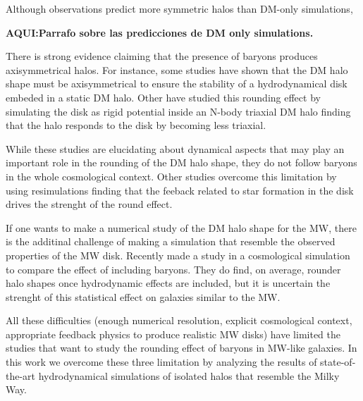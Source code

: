 \documentclass[a4paper,fleqn,usenatbib]{mnras}
\begin{document}
Although observations predict more symmetric halos than DM-only
simulations, 

{\bf AQUI:Parrafo sobre las predicciones de DM only simulations.} 

There is strong evidence claiming that the presence of
baryons produces axisymmetrical halos. 
For instance, some studies have shown that the DM halo shape must be
axisymmetrical to ensure the stability of a hydrodynamical disk
embeded in a static DM halo. 
Other have studied this rounding effect by simulating the disk as rigid
potential inside an N-body triaxial DM
halo \cite{Debattista_et_al._2008,Debattista_et_al._2013,Kazantzidis_et_al._2010}
finding that the halo responds to the disk by becoming less triaxial. 

While these studies are elucidating about dynamical aspects that may
play an important role in the rounding of the DM halo shape, they do not
follow baryons in the whole cosmological context. 
Other studies overcome this limitation by using resimulations 
\citep{Abadi_et_al._2010,Bryan_et_al._2013} finding that the
feeback related to star formation in the disk drives the strenght of
the round effect. 


If one wants to make a numerical study of the DM halo shape for the
MW, there is the additinal challenge of making a simulation that
resemble the observed properties of the MW disk.
Recently \cite{2018arXiv180907255C} made a study in a cosmological
simulation to compare the effect of including baryons. They do find,
on average, rounder halo shapes once hydrodynamic effects are
included, but it is uncertain the strenght of this statistical effect
on galaxies similar to the MW.


All these difficulties (enough numerical resolution, explicit
cosmological context, appropriate feedback physics to produce
realistic MW disks) have limited the studies that want to study the
rounding effect of baryons in MW-like galaxies.
In this work we overcome these three limitation by analyzing the
results of state-of-the-art hydrodynamical simulations of isolated
halos that resemble the Milky Way.
\end{document}
